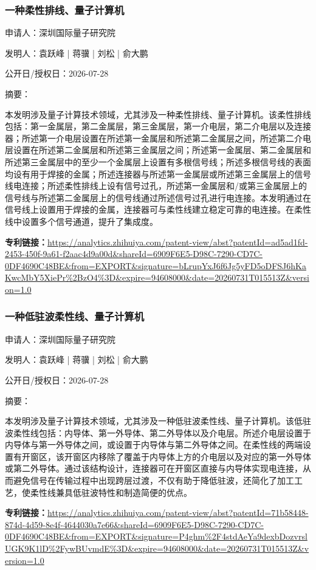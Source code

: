 \documentclass[12pt,a4paper]{ctexart}
\begin{document}
\subsubsection{ 一种柔性排线、量子计算机 }

申请人：深圳国际量子研究院

发明人：袁跃峰 | 蒋骥 | 刘松 | 俞大鹏

公开日/授权日：2026-07-28

摘要：

本发明涉及量子计算技术领域，尤其涉及一种柔性排线、量子计算机。该柔性排线包括：第一金属层，第二金属层，第三金属层，第一介电层，第二介电层以及连接器；所述第一介电层设置在所述第一金属层和所述第二金属层之间，所述第二介电层设置在所述第二金属层和所述第三金属层之间；所述第一金属层、第二金属层和所述第三金属层中的至少一个金属层上设置有多根信号线；所述多根信号线的表面均设有用于焊接的金属；所述连接器与所述第一金属层或所述第三金属层上的信号线电连接；所述柔性排线上设有信号过孔，所述第一金属层和/或第三金属层上的信号线与所述第二金属层上的信号线通过所述信号过孔进行电连接。本发明通过在信号线上设置用于焊接的金属，连接器可与柔性线建立稳定可靠的电连接。在柔性线中设置多个信号通道，提升了集成度。

\noindent\textbf{专利链接：}\url{https://analytics.zhihuiya.com/patent-view/abst?patentId=ad5ad1fd-2453-450f-9a61-f2aac4d9a00d&shareId=6909F6E5-D98C-7290-CD7C-0DF4690C48BE&from=EXPORT&signature=bLrupYxJ6f6Jg5yFD5oDFSJ6hKaKwcMbY5XiePr%2BzO4%3D&expire=94608000&date=20260731T015513Z&version=1.0}

\subsubsection{ 一种低驻波柔性线、量子计算机 }

申请人：深圳国际量子研究院

发明人：袁跃峰 | 蒋骥 | 刘松 | 俞大鹏

公开日/授权日：2026-07-28

摘要：

本发明涉及量子计算技术领域，尤其涉及一种低驻波柔性线、量子计算机。该低驻波柔性线包括：内导体、第一外导体、第二外导体以及介电层。所述介电层设置于内导体与第一外导体之间，或设置于内导体与第二外导体之间。在柔性线的两端设置有开窗区，该开窗区内移除了覆盖于内导体上方的介电层以及对应的第一外导体或第二外导体。通过该结构设计，连接器可在开窗区直接与内导体实现电连接，从而避免信号在传输过程中出现跨层过渡，不仅有助于降低驻波，还简化了加工工艺，使柔性线兼具低驻波特性和制造简便的优点。

\noindent\textbf{专利链接：}\url{https://analytics.zhihuiya.com/patent-view/abst?patentId=71b58448-874d-4d59-8e4f-4644030a7e66&shareId=6909F6E5-D98C-7290-CD7C-0DF4690C48BE&from=EXPORT&signature=P4ghm%2F4stdAeYa9dexbDozvrslUGK9K1lD%2FywBUvmdE%3D&expire=94608000&date=20260731T015513Z&version=1.0}
\end{document}
